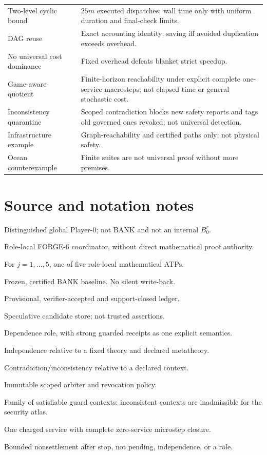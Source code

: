 \documentclass[11pt,letterpaper,oneside]{book}
\theoremstyle{definition}
\theoremstyle{remark}
\begin{document}
\begin{longtable}{>{\raggedright\arraybackslash}p{}>{\raggedright\arraybackslash}p{}}
Two-level cyclic bound & $25m$ executed dispatches; wall time only with uniform duration and final-check limits.\\
DAG reuse & Exact accounting identity; saving iff avoided duplication exceeds overhead.\\
No universal cost dominance & Fixed overhead defeats blanket strict speedup.\\
Game-aware quotient & Finite-horizon reachability under explicit complete one-service macrosteps; not elapsed time or general stochastic cost.\\
Inconsistency quarantine & Scoped contradiction blocks new safety reports and tags old governed ones revoked; not universal detection.\\
Infrastructure example & Graph-reachability and certified paths only; not physical safety.\\
Ocean counterexample & Finite suites are not universal proof without more premises.\\
\bottomrule
\end{longtable}
\normalsize

\chapter{Source and notation notes}
\begin{description}[style=nextline,leftmargin=2.4cm]
\item[$B^\star$] Distinguished global Player-0; not BANK and not an internal $B_0^r$.
\item[$B_0^r$] Role-local FORGE-6 coordinator, without direct mathematical proof authority.
\item[$B_j^r$] For $j=1,\ldots,5$, one of five role-local mathematical ATPs.
\item[$K_0$] Frozen, certified BANK baseline. No silent write-back.
\item[$L_t$] Provisional, verifier-accepted and support-closed ledger.
\item[$U_t$] Speculative candidate store; not trusted assertions.
\item[$D$] Dependence role, with strong guarded receipts as one explicit semantics.
\item[$I$] Independence relative to a fixed theory and declared metatheory.
\item[$C$] Contradiction/inconsistency relative to a declared context.
\item[$\Pi_0$] Immutable scoped arbiter and revocation policy.
\item[$\mathcal C$] Family of satisfiable guard contexts; inconsistent contexts are inadmissible for the security atlas.
\item[$\xRightarrow{a}$] One charged service with complete zero-service microstep closure.
\item[$\mathsf{UNKNOWN}$] Bounded nonsettlement after stop, not pending, independence, or a role.
\end{description}
\end{document}

